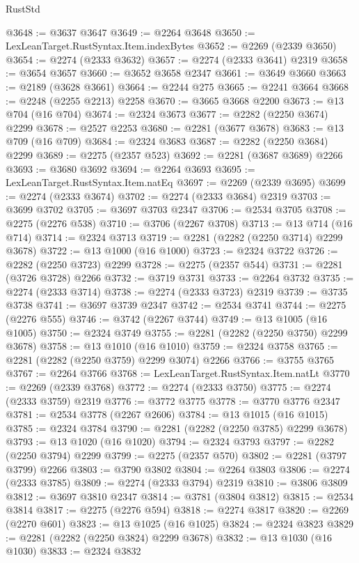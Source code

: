 \begin{lexlean}{RustStd}
\begin{coremodule}
@3648 := @3637 @3647
@3649 := @2264 @3648
@3650 := LexLeanTarget.RustSyntax.Item.indexBytes
@3652 := @2269 (@2339 @3650)
@3654 := @2274 (@2333 @3632)
@3657 := @2274 (@2333 @3641) @2319
@3658 := @3654 @3657
@3660 := @3652 @3658 @2347
@3661 := @3649 @3660
@3663 := @2189 (@3628 @3661)
@3664 := @2244 @275
@3665 := @2241 @3664
@3668 := @2248 (@2255 @2213) @2258
@3670 := @3665 @3668 @2200
@3673 := @13 @704 (@16 @704)
@3674 := @2324 @3673
@3677 := @2282 (@2250 @3674) @2299
@3678 := @2527 @2253
@3680 := @2281 (@3677 @3678)
@3683 := @13 @709 (@16 @709)
@3684 := @2324 @3683
@3687 := @2282 (@2250 @3684) @2299
@3689 := @2275 (@2357 @523)
@3692 := @2281 (@3687 @3689) @2266
@3693 := @3680 @3692
@3694 := @2264 @3693
@3695 := LexLeanTarget.RustSyntax.Item.natEq
@3697 := @2269 (@2339 @3695)
@3699 := @2274 (@2333 @3674)
@3702 := @2274 (@2333 @3684) @2319
@3703 := @3699 @3702
@3705 := @3697 @3703 @2347
@3706 := @2534 @3705
@3708 := @2275 (@2276 @538)
@3710 := @3706 (@2267 @3708)
@3713 := @13 @714 (@16 @714)
@3714 := @2324 @3713
@3719 := @2281 (@2282 (@2250 @3714) @2299 @3678)
@3722 := @13 @1000 (@16 @1000)
@3723 := @2324 @3722
@3726 := @2282 (@2250 @3723) @2299
@3728 := @2275 (@2357 @544)
@3731 := @2281 (@3726 @3728) @2266
@3732 := @3719 @3731
@3733 := @2264 @3732
@3735 := @2274 (@2333 @3714)
@3738 := @2274 (@2333 @3723) @2319
@3739 := @3735 @3738
@3741 := @3697 @3739 @2347
@3742 := @2534 @3741
@3744 := @2275 (@2276 @555)
@3746 := @3742 (@2267 @3744)
@3749 := @13 @1005 (@16 @1005)
@3750 := @2324 @3749
@3755 := @2281 (@2282 (@2250 @3750) @2299 @3678)
@3758 := @13 @1010 (@16 @1010)
@3759 := @2324 @3758
@3765 := @2281 (@2282 (@2250 @3759) @2299 @3074) @2266
@3766 := @3755 @3765
@3767 := @2264 @3766
@3768 := LexLeanTarget.RustSyntax.Item.natLt
@3770 := @2269 (@2339 @3768)
@3772 := @2274 (@2333 @3750)
@3775 := @2274 (@2333 @3759) @2319
@3776 := @3772 @3775
@3778 := @3770 @3776 @2347
@3781 := @2534 @3778 (@2267 @2606)
@3784 := @13 @1015 (@16 @1015)
@3785 := @2324 @3784
@3790 := @2281 (@2282 (@2250 @3785) @2299 @3678)
@3793 := @13 @1020 (@16 @1020)
@3794 := @2324 @3793
@3797 := @2282 (@2250 @3794) @2299
@3799 := @2275 (@2357 @570)
@3802 := @2281 (@3797 @3799) @2266
@3803 := @3790 @3802
@3804 := @2264 @3803
@3806 := @2274 (@2333 @3785)
@3809 := @2274 (@2333 @3794) @2319
@3810 := @3806 @3809
@3812 := @3697 @3810 @2347
@3814 := @3781 (@3804 @3812)
@3815 := @2534 @3814
@3817 := @2275 (@2276 @594)
@3818 := @2274 @3817
@3820 := @2269 (@2270 @601)
@3823 := @13 @1025 (@16 @1025)
@3824 := @2324 @3823
@3829 := @2281 (@2282 (@2250 @3824) @2299 @3678)
@3832 := @13 @1030 (@16 @1030)
@3833 := @2324 @3832

\end{coremodule}
\end{lexlean}
